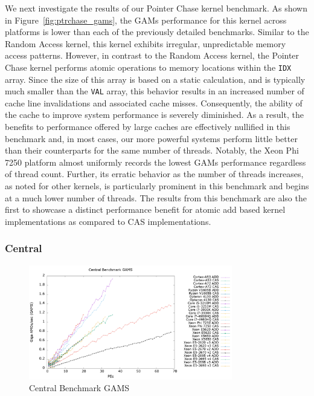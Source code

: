 We next investigate the results of our Pointer Chase kernel benchmark.
As shown in Figure~\ref{fig:ptrchase_gams}, the GAMs performance for this kernel across platforms is lower than each of the previously detailed benchmarks.
Similar to the Random Access kernel, this kernel exhibits irregular, unpredictable memory access patterns.
However, in contrast to the Random Access kernel, the Pointer Chase kernel performs atomic operations to memory locations within the \texttt{IDX} array.
Since the size of this array is based on a static calculation, and is typically much smaller than the \texttt{VAL} array, this behavior results in an increased number of cache line invalidations and associated cache misses. 
Consequently, the ability of the cache to improve system performance is severely diminished.
As a result, the benefits to performance offered by large caches are effectively nullified in this benchmark and, in most cases, our more powerful systems perform little better than their counterparts for the same number of threads.
Notably, the Xeon Phi 7250 platform almost uniformly records the lowest GAMs performance regardless of thread count.
Further, its erratic behavior as the number of threads increases, as noted for other kernels, is particularly prominent in this benchmark and begins at a much lower number of threads.
The results from this benchmark are also the first to showcase a distinct performance benefit for atomic add based kernel implementations as compared to CAS implementations.

\subsubsection{Central}
\label{subsubsec:central_res}

\begin{figure}[!t]
\centering
\includegraphics[width=3.5in]{figures/CENTRAL_GAMS.png}
\caption{Central Benchmark GAMS}
\label{fig:central_gams}
\end{figure}

